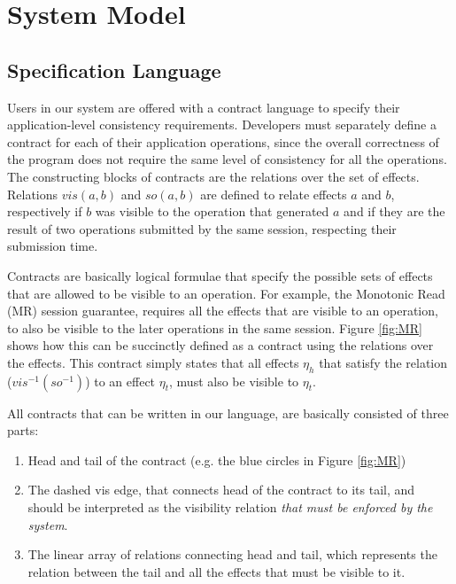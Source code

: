 \section{System Model}
\subsection {Specification Language}



Users in our system are offered with a contract language to specify
their application-level consistency requirements.  Developers must
separately define a  contract for each of their application
operations, since the overall correctness of the program does not
require the same level of consistency for all the operations.  The
constructing blocks of contracts are the relations over the set of
effects. Relations $vis(a,b)$ and $so(a,b)$ are defined to relate
effects $a$ and $b$, respectively if $b$ was visible to the operation
that generated $a$ and if they are the result of two operations
submitted by the same session, respecting their submission time. 


Contracts are basically logical formulae that specify the possible sets of effects that are allowed to be visible to an operation. For example, the Monotonic Read (MR) session guarantee, requires all the effects that are visible to an operation, to also be visible to the later operations in the same session. Figure \ref {fig:MR} shows how this can be succinctly defined as a contract using the relations over the effects. This contract simply states that all effects $\eta_h$ that satisfy the relation ($vis^{-1} (so^{-1})$) to an effect $\eta_t$, must also be visible to $\eta_t$. 


All contracts that can be written in our language, are basically consisted of three parts:
\begin{enumerate}
  \item Head and tail of the contract (e.g. the blue circles in Figure \ref {fig:MR})
  \item The dashed vis edge, that connects head of the contract to its tail, and should be interpreted as the visibility relation \emph{that must be enforced by the system}. 
  \item The linear array of relations connecting head and tail, which represents the relation between the tail and all the effects that must be visible to it.  
\end{enumerate}

